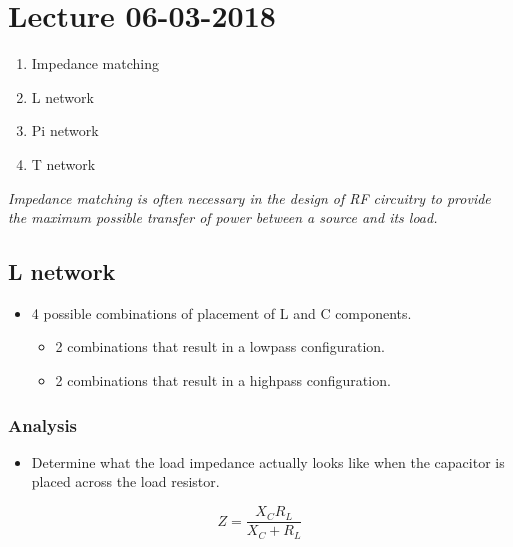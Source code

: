 \section{Lecture 06-03-2018}

\begin{enumerate}
	\item Impedance matching
	\item L network
	\item Pi network
	\item T network
\end{enumerate}

\noindent{} \vspace{3mm}

\noindent\textit{Impedance matching is often necessary in the design of RF circuitry to provide the maximum possible transfer of power	between a source and its load.}

\subsection{L network}
\begin{itemize}
	\item 4 possible combinations of placement of L and C components.
	\begin{itemize}
		\item 2 combinations that result in a lowpass configuration.
		\item 2 combinations that result in a highpass configuration.
	\end{itemize}
\end{itemize}

\subsubsection{Analysis}
\begin{itemize}
	\item Determine what the load impedance actually looks
	like when the capacitor is placed across the load resistor.
\end{itemize}

\begin{equation}
Z = \dfrac{X_C R_L}{X_C+R_L}
\end{equation}


